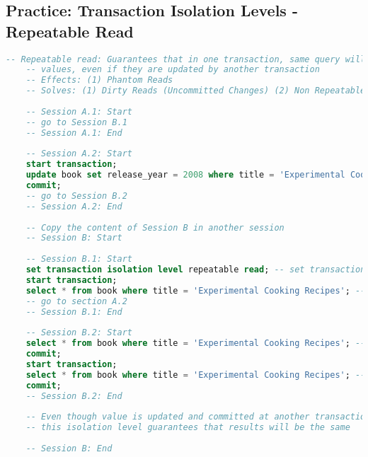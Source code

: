 \subsection{Practice: Transaction Isolation Levels - Repeatable Read}
\begin{lstlisting}[language=SQL]
	-- Repeatable read: Guarantees that in one transaction, same query will return same
	-- values, even if they are updated by another transaction 
	-- Effects: (1) Phantom Reads
	-- Solves: (1) Dirty Reads (Uncommitted Changes) (2) Non Repeatable Reads
	
	-- Session A.1: Start
	-- go to Session B.1
	-- Session A.1: End
	
	-- Session A.2: Start
	start transaction;
	update book set release_year = 2008 where title = 'Experimental Cooking Recipes';
	commit;
	-- go to Session B.2
	-- Session A.2: End
	
	-- Copy the content of Session B in another session
	-- Session B: Start
	
	-- Session B.1: Start
	set transaction isolation level repeatable read; -- set transaction isolation level to repeatable read
	start transaction;
	select * from book where title = 'Experimental Cooking Recipes'; -- release year is 2035
	-- go to section A.2
	-- Session B.1: End
	
	-- Session B.2: Start
	select * from book where title = 'Experimental Cooking Recipes'; -- release year is still 2035
	commit;
	start transaction;
	select * from book where title = 'Experimental Cooking Recipes'; -- now new transaction sees updated value (release year 2008)
	commit;
	-- Session B.2: End
	
	-- Even though value is updated and committed at another transaction,
	-- this isolation level guarantees that results will be the same
	
	-- Session B: End
\end{lstlisting}
